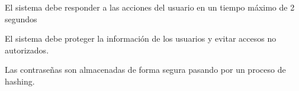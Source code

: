 \begin{nonfunctional}
    \item El sistema debe responder a las acciones del usuario en un tiempo máximo de 2 segundos
    \item El sistema debe proteger la información de los usuarios y evitar accesos no autorizados.
    \item Las contraseñas son almacenadas de forma segura pasando por un proceso de hashing.
\end{nonfunctional}